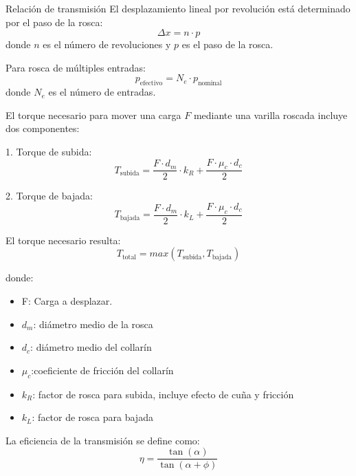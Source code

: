 Relación de transmisión
El desplazamiento lineal por revolución está determinado por el paso de la rosca:
\begin{equation}
    \Delta x = n \cdot p
\end{equation}
donde $n$ es el número de revoluciones y $p$ es el paso de la rosca.

Para rosca de múltiples entradas:
\begin{equation}
    p_{\text{efectivo}} = N_e \cdot p_{\text{nominal}}
\end{equation}
donde $N_e$ es el número de entradas.

El torque necesario para mover una carga $F$ mediante una varilla roscada incluye dos componentes:

1. Torque de subida:
\begin{equation}
T_{\text{subida}} = \frac{F \cdot d_m}{2} \cdot k_R + \frac{F \cdot \mu_c \cdot d_c}{2}
\label{eq:torque_subida}
\end{equation}

2. Torque de bajada:
\begin{equation}
T_{\text{bajada}} = \frac{F \cdot d_m}{2} \cdot k_L + \frac{F \cdot \mu_c \cdot d_c}{2}
\label{eq:torque_bajada}
\end{equation}

El torque necesario resulta:
\begin{equation}
    T_{\text{total}} = max(T_{\text{subida}}, T_{\text{bajada}})
    \label{eq:torque_total_varilla}
\end{equation}

donde:
\begin{itemize}[label=$\bullet$]
    \item F: Carga a desplazar.
    \item $d_m$: diámetro medio de la rosca
    \item $d_c$: diámetro medio del collarín
    \item $\mu_c$:coeficiente de fricción del collarín
    \item $k_R$:  factor de rosca para subida, incluye efecto de cuña y fricción
    \item $k_L$: factor de rosca para bajada
\end{itemize}

La eficiencia de la transmisión se define como:
\begin{equation}
    \eta = \frac{\tan(\alpha)}{\tan(\alpha + \phi)}
\end{equation}

